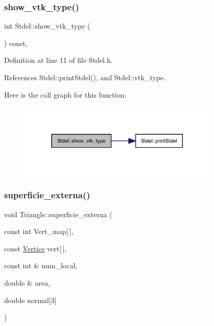 \subsubsection{\texorpdfstring{show\+\_\+vtk\+\_\+type()}{show\_vtk\_type()}}
{\footnotesize\ttfamily int Stdel\+::show\+\_\+vtk\+\_\+type (\begin{DoxyParamCaption}{ }\end{DoxyParamCaption}) const\hspace{0.3cm}{\ttfamily [inline]}, {\ttfamily [inherited]}}



Definition at line 11 of file Stdel.\+h.



References Stdel\+::print\+Stdel(), and Stdel\+::vtk\+\_\+type.

Here is the call graph for this function\+:
\nopagebreak
\begin{figure}[H]
\begin{center}
\leavevmode
\includegraphics[width=272pt]{classStdel_a56288a857b95a55c8b7eb5b473e836d9_cgraph}
\end{center}
\end{figure}
\mbox{\label{classTriangle_a1067d23aa0cc1580d0deed90f4cf3d37}} 
\subsubsection{\texorpdfstring{superficie\+\_\+externa()}{superficie\_externa()}}
{\footnotesize\ttfamily void Triangle\+::superficie\+\_\+externa (\begin{DoxyParamCaption}\item[{const int}]{Vert\+\_\+map\mbox{[}$\,$\mbox{]},  }\item[{const \hyperlink{structVertice}{Vertice}}]{vert\mbox{[}$\,$\mbox{]},  }\item[{const int \&}]{num\+\_\+local,  }\item[{double \&}]{area,  }\item[{double}]{normal\mbox{[}3\mbox{]} }\end{DoxyParamCaption})\hspace{0.3cm}{\ttfamily [virtual]}}



